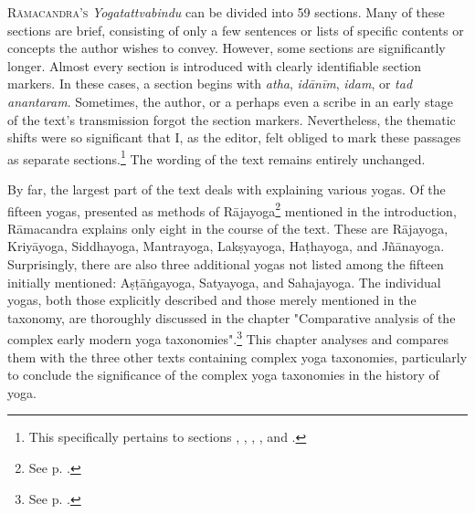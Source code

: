 \lettrine[lines=2, lhang=0.2, loversize=0.25]{R}{āmacandra's} \emph{Yogatattvabindu} can be divided into 59 sections. Many of these sections are brief, consisting of only a few sentences or lists of specific contents or concepts the author wishes to convey. However, some sections are significantly longer. Almost every section is introduced with clearly identifiable section markers. In these cases, a section begins with \textit{atha}, \textit{idānīm}, \textit{idam}, or \textit{tad anantaram}. Sometimes, the author, or a perhaps even a scribe in an early stage of the text's transmission forgot the section markers. Nevertheless, the thematic shifts were so significant that I, as the editor, felt obliged to mark these passages as separate sections.\footnote{This specifically pertains to sections , , , , and .} The wording of the text remains entirely unchanged.

By far, the largest part of the text deals with explaining various yogas. Of the fifteen yogas, presented as methods of Rājayoga\footnote{See p. \pageref{into}.} mentioned in the introduction, Rāmacandra explains only eight in the course of the text. These are Rājayoga, Kriyāyoga, Siddhayoga, Mantrayoga, Lakṣyayoga, Haṭhayoga, and Jñānayoga. Surprisingly, there are also three additional yogas not listed among the fifteen initially mentioned: Aṣṭāṅgayoga, Satyayoga, and Sahajayoga. The individual yogas, both those explicitly described and those merely mentioned in the taxonomy, are thoroughly discussed in the chapter "Comparative analysis of the complex early modern yoga taxonomies".\footnote{See p. \pageref{yogatax}.} This chapter analyses and compares them with the three other texts containing complex yoga taxonomies, particularly to conclude the significance of the complex yoga taxonomies in the history of yoga.


